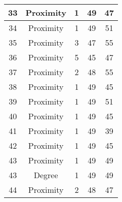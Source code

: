 \documentclass[results.tex]{subfiles}
\begin{document}
\begin{center}
\begin{tabular}{| c || c | c | c | c |}
            \hline
            33                      & Proximity                    & 1                      & 49                      & 47                   \\
            \hline
            34                      & Proximity                    & 1                      & 49                      & 51                   \\
            \hline
            35                      & Proximity                    & 3                      & 47                      & 55                   \\
            \hline
            36                      & Proximity                    & 5                      & 45                      & 47                   \\
            \hline
            37                      & Proximity                    & 2                      & 48                      & 55                   \\
            \hline
            38                      & Proximity                    & 1                      & 49                      & 45                   \\
            \hline
            39                      & Proximity                    & 1                      & 49                      & 51                   \\
            \hline
            40                      & Proximity                    & 1                      & 49                      & 45                   \\
            \hline
            41                      & Proximity                    & 1                      & 49                      & 39                   \\
            \hline
            42                      & Proximity                    & 1                      & 49                      & 45                   \\
            \hline
            43                      & Proximity                    & 1                      & 49                      & 49                   \\
            \hline
            43                      & Degree                       & 1                      & 49                      & 49                   \\
            \hline
            44                      & Proximity                    & 2                      & 48                      & 47                   \\

\end{tabular}
\end{center}
\end{document}
